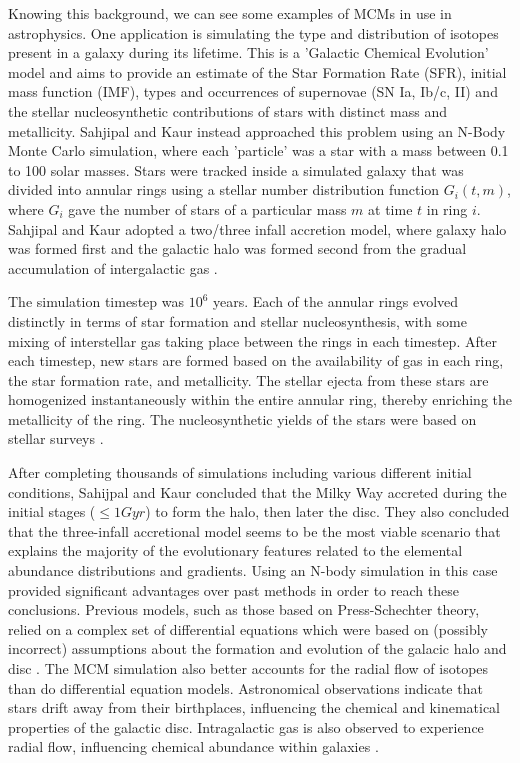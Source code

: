 \documentclass[amsmath,amssymb,reprint,
tightenlines,aps,prl,11pt]{revtex4-1}
\begin{document}
Knowing this background, we can see some examples of MCMs in use in astrophysics. One application is simulating the type and distribution of isotopes present in a galaxy during its lifetime. This is a 'Galactic Chemical Evolution' model and aims to provide an estimate of the Star Formation Rate (SFR), initial mass function (IMF), types and occurrences of supernovae (SN Ia, Ib/c, II) and the stellar nucleosynthetic contributions of stars with distinct mass and metallicity. Sahjipal and Kaur instead approached this problem using an N-Body Monte Carlo simulation, where each 'particle' was a star with a mass between 0.1 to 100 solar masses. Stars were tracked inside a simulated galaxy that was divided into annular rings using a stellar number distribution function $G_i(t, m)$, where $G_i$ gave the number of stars of a particular mass $m$ at time $t$ in ring $i$. Sahjipal and Kaur adopted a two/three infall accretion model, where galaxy halo was formed first and the galactic halo was formed second from the gradual accumulation of intergalactic gas \cite{sahijpalMonteCarloBased2018}. 

The simulation timestep was $10^6$ years. Each of the annular rings evolved distinctly in terms of star formation and stellar nucleosynthesis, with some mixing of interstellar gas taking place between the rings in each timestep. After each timestep, new stars are formed based on the availability of gas in each ring, the star formation rate, and metallicity. The stellar ejecta from these stars are homogenized instantaneously within the entire annular ring, thereby enriching the metallicity of the ring. The nucleosynthetic yields of the stars were based on stellar surveys \cite{sahijpalMonteCarloBased2018}. 

After completing thousands of simulations including various different initial conditions, Sahijpal and Kaur concluded that the Milky Way accreted during the initial stages ($\leq 1 Gyr$) to form the halo, then later the disc. They also concluded that the  three-infall accretional model seems to be the most viable scenario that explains the majority of the evolutionary features related to the elemental abundance distributions and gradients. Using an N-body simulation in this case provided significant advantages over past methods in order to reach these conclusions. Previous models, such as those based on Press-Schechter theory, relied on a complex set of differential equations which were based on (possibly incorrect) assumptions about the formation and evolution of the galacic halo and disc \cite{sahijpalMonteCarloBased2018}. The MCM simulation also better accounts for the radial flow of isotopes than do differential equation models. Astronomical observations indicate that stars drift away from their birthplaces, influencing the chemical and kinematical properties of the galactic disc. Intragalactic gas is also observed to experience radial flow, influencing chemical abundance within galaxies \cite{sahijpalMonteCarloBased2018}. 
\end{document}
